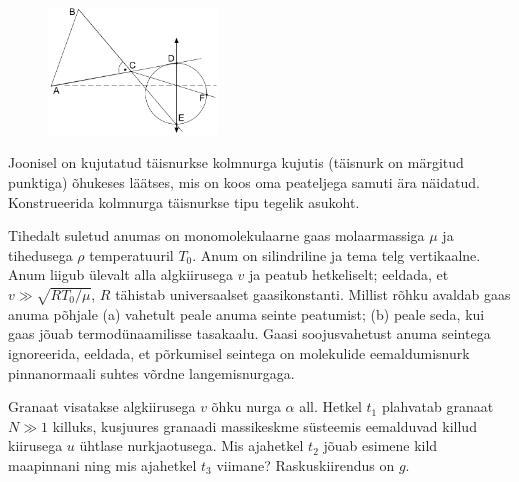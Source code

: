 \documentclass[10pt]{article}
\begin{document}

\begin{figure}
	\vspace{-30pt}
	\begin{center}
		\hspace{-10pt}
		\includegraphics[width = 0.4\textwidth]{2018-lahg-08-yl.pdf}
	\end{center}
\end{figure}
Joonisel on kujutatud täisnurkse kolmnurga kujutis (täisnurk on märgitud punktiga) õhukeses läätses, mis on koos oma peateljega samuti ära näidatud. Konstrueerida kolmnurga täisnurkse tipu tegelik asukoht.
\probend
\bigskip


Tihedalt suletud anumas on monomolekulaarne gaas molaarmassiga $\mu$ ja tihedusega $\rho$ temperatuuril $T_0$. Anum on silindriline ja tema telg vertikaalne. Anum liigub ülevalt alla algkiirusega $v$ ja peatub hetkeliselt; eeldada, et $v\gg \sqrt{RT_0/\mu}$, $R$ tähistab universaalset gaasikonstanti. Millist rõhku avaldab gaas anuma põhjale (a) vahetult peale anuma seinte peatumist; (b) peale seda, kui gaas jõuab termodünaamilisse tasakaalu. Gaasi soojusvahetust anuma seintega ignoreerida, eeldada, et põrkumisel seintega on molekulide eemaldumisnurk pinnanormaali suhtes võrdne langemisnurgaga.
\probend
\bigskip

\setAuthor{}

Granaat visatakse algkiirusega $v$ õhku nurga $\alpha$ all. Hetkel $t_1$ plahvatab granaat $N\gg1$ killuks, kusjuures granaadi massikeskme süsteemis eemalduvad killud kiirusega $u$ ühtlase nurkjaotusega. Mis ajahetkel $t_2$ jõuab esimene kild maapinnani ning mis ajahetkel $t_3$ viimane? Raskuskiirendus on $g$.
\probend
\bigskip
\end{document}

